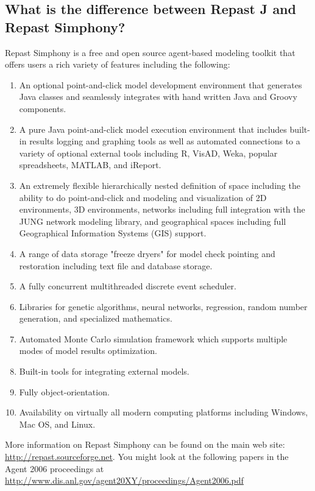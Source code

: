 \documentclass[11pt]{article}
\begin{document}
\subsection{What is the difference between Repast J and Repast Simphony?}
\label{gq:rj_vs_rs}
Repast Simphony is a free and open source agent-based modeling toolkit that offers users a rich variety of features including the following:
\begin{enumerate}
\item An optional point-and-click model development environment that generates Java classes and seamlessly integrates with hand written Java and Groovy components.
\item A pure Java point-and-click model execution environment that includes built-in results logging and graphing tools as well as automated connections to a variety of optional external tools including R, VisAD, Weka, popular spreadsheets, MATLAB, and iReport.
\item An extremely flexible hierarchically nested definition of space including the ability to do point-and-click and modeling and visualization of 2D environments, 3D environments, networks including full integration with the JUNG network modeling library, and geographical spaces including full Geographical Information Systems (GIS) support.
\item A range of data storage "freeze dryers" for model check pointing and restoration including text file and database storage.
\item A fully concurrent multithreaded discrete event scheduler. 
\item Libraries for genetic algorithms, neural networks, regression, random number generation, and
specialized mathematics.
\item Automated Monte Carlo simulation framework which supports multiple modes of model results
optimization. 
\item Built-in tools for integrating external models. 
\item Fully object-orientation.
\item Availability on virtually all modern computing platforms including Windows, Mac OS, and Linux.
\end{enumerate}

More information on Repast Simphony can be found on the main web site:  \url{http://repast.sourceforge.net}.
You might look at the following papers in the Agent 2006 proceedings at \url{http://www.dis.anl.gov/agent20XY/proceedings/Agent2006.pdf}
\end{document}
